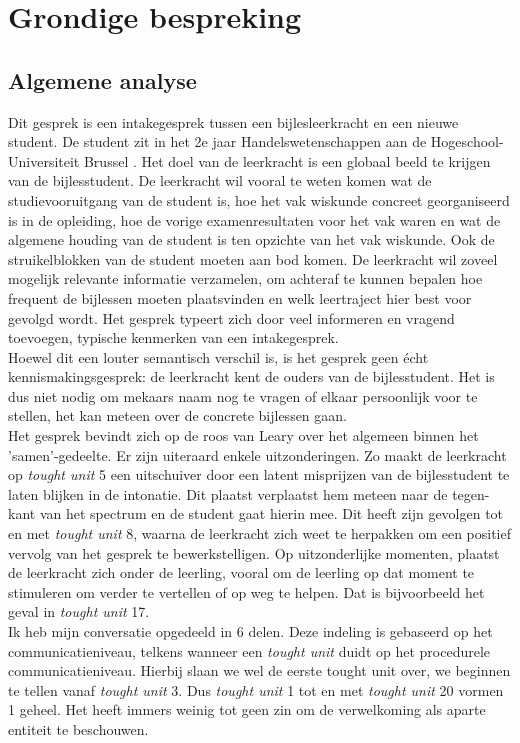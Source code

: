 \documentclass[a4paper,12pt]{article}
\theoremstyle{definition}
\begin{document}
 \section{Grondige bespreking}
\subsection{Algemene analyse}
Dit gesprek is een intakegesprek tussen een bijlesleerkracht en een nieuwe 
student. De student zit in het 2e jaar Handelswetenschappen aan de Hogeschool-Universiteit Brussel . Het doel van de leerkracht is een globaal beeld te krijgen van de 
bijlesstudent. De leerkracht wil vooral te weten komen wat de studievooruitgang 
van de student is, hoe het vak wiskunde concreet georganiseerd is in de 
opleiding, hoe de vorige examenresultaten voor het vak waren en wat de algemene 
houding van de student is ten opzichte van het vak wiskunde. Ook de 
struikelblokken van de student moeten aan bod komen. De leerkracht wil zoveel 
mogelijk relevante informatie verzamelen, om achteraf te kunnen bepalen hoe 
frequent de bijlessen moeten plaatsvinden en welk leertraject hier best voor 
gevolgd wordt. Het gesprek typeert zich door veel informeren en vragend toevoegen, typische kenmerken van een intakegesprek. \\
Hoewel dit een louter semantisch verschil is, is het gesprek geen écht 
kennismakingsgesprek: de leerkracht kent de ouders van de bijlesstudent. Het is 
dus niet nodig om mekaars naam nog te vragen of elkaar persoonlijk voor te 
stellen, het kan meteen over de concrete bijlessen gaan.\\

Het gesprek bevindt zich op de roos van Leary over het algemeen binnen het 
'samen'-gedeelte. Er zijn uiteraard enkele uitzonderingen. Zo maakt de leerkracht op \emph{tought unit} 5
een uitschuiver door een latent misprijzen van de bijlesstudent te laten blijken in de intonatie. Dit plaatst verplaatst hem meteen naar de tegen-kant van het spectrum en de student gaat hierin mee. Dit heeft zijn gevolgen tot en met \emph{tought unit} 8, waarna de leerkracht 
zich weet te herpakken om een positief vervolg van het gesprek te bewerkstelligen. Op uitzonderlijke momenten, plaatst de leerkracht
zich onder de leerling, vooral om de leerling op dat moment te stimuleren om verder te vertellen of op weg te helpen. Dat is bijvoorbeeld het geval in \emph{tought unit} 17.  \\

Ik heb mijn conversatie opgedeeld in 6 delen. Deze indeling is gebaseerd op het 
communicatieniveau, telkens wanneer een \emph{tought unit} duidt op het 
procedurele communicatieniveau. Hierbij slaan we wel de eerste tought unit over, 
we beginnen te tellen vanaf \emph{tought unit} 3. Dus \emph{tought unit} 1 tot 
en met \emph{tought unit} 20 vormen 1 geheel. Het heeft immers weinig tot geen 
zin om de verwelkoming als aparte entiteit te beschouwen.\\
\end{document}
